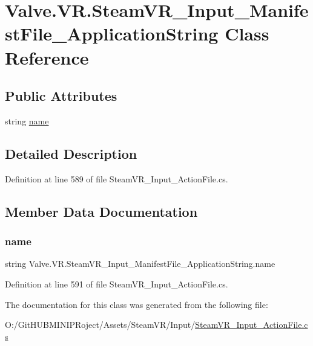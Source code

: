 \hypertarget{class_valve_1_1_v_r_1_1_steam_v_r___input___manifest_file___application_string}{}\section{Valve.\+V\+R.\+Steam\+V\+R\+\_\+\+Input\+\_\+\+Manifest\+File\+\_\+\+Application\+String Class Reference}
\label{class_valve_1_1_v_r_1_1_steam_v_r___input___manifest_file___application_string}
\subsection*{Public Attributes}
\begin{DoxyCompactItemize}
\item 
string \mbox{\hyperlink{class_valve_1_1_v_r_1_1_steam_v_r___input___manifest_file___application_string_aabb58fb7f0425c34afb91377b05c94f9}{name}}
\end{DoxyCompactItemize}


\subsection{Detailed Description}


Definition at line 589 of file Steam\+V\+R\+\_\+\+Input\+\_\+\+Action\+File.\+cs.



\subsection{Member Data Documentation}
\mbox{\label{class_valve_1_1_v_r_1_1_steam_v_r___input___manifest_file___application_string_aabb58fb7f0425c34afb91377b05c94f9}} 
\subsubsection{\texorpdfstring{name}{name}}
{\footnotesize\ttfamily string Valve.\+V\+R.\+Steam\+V\+R\+\_\+\+Input\+\_\+\+Manifest\+File\+\_\+\+Application\+String.\+name}



Definition at line 591 of file Steam\+V\+R\+\_\+\+Input\+\_\+\+Action\+File.\+cs.



The documentation for this class was generated from the following file\+:\begin{DoxyCompactItemize}
\item 
O\+:/\+Git\+H\+U\+B\+M\+I\+N\+I\+P\+Roject/\+Assets/\+Steam\+V\+R/\+Input/\mbox{\hyperlink{_steam_v_r___input___action_file_8cs}{Steam\+V\+R\+\_\+\+Input\+\_\+\+Action\+File.\+cs}}\end{DoxyCompactItemize}

